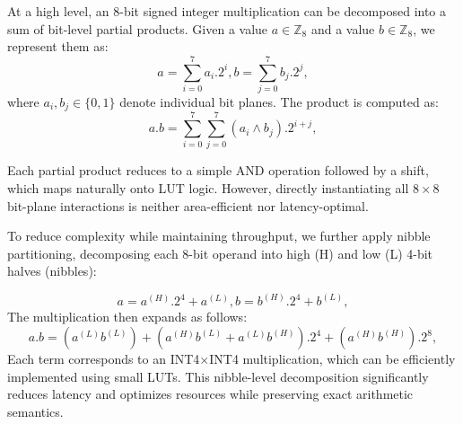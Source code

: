 \documentclass[conference]{IEEEtran}
\begin{document}

At a high level, an 8-bit signed integer multiplication can be decomposed into a sum of bit-level partial products. Given a value $a \in \mathbb{Z}_8$  and a value $b \in \mathbb{Z}_8$, we represent them as:
\begin{equation}
     a = \sum_{i=0}^{7}a_i.2^i, b = \sum_{j=0}^{7}b_j.2^j,
\label{eq_nib1}
\end{equation}
where $a_i,b_j \in \{0,1\}$ denote individual bit planes. The product is computed as: 
\begin{equation}
     a.b = \sum_{i=0}^{7}\sum_{j=0}^{7}(a_i \wedge b_j).2^{i+j},
\label{eq_nib2}
\end{equation}

Each partial product reduces to a simple AND operation followed by a shift, which maps naturally onto LUT logic. However, directly instantiating all $8 \times 8$ bit-plane interactions is neither area-efficient nor latency-optimal.

To reduce complexity while maintaining throughput, we further apply nibble partitioning, decomposing each 8-bit operand into high (H) and low (L) 4-bit halves (nibbles):

\begin{equation}
     a = a^{(H)}.2^4 + a^{(L)}, b = b^{(H)}.2^4 + b^{(L)},
\label{eq_nib3}
\end{equation}
The multiplication then expands as follows:
\begin{equation}
     a.b = (a^{(L)}b^{(L)}) + (a^{(H)}b^{(L)} +a^{(L)}b^{(H)}).2^4 + (a^{(H)}b^{(H)}).2^8,
\label{eq_nib4}
\end{equation}
Each term corresponds to an INT4$\times$INT4 multiplication, which can be efficiently implemented using small LUTs. This nibble-level decomposition significantly reduces latency and optimizes resources while preserving exact arithmetic semantics. %
\end{document}
